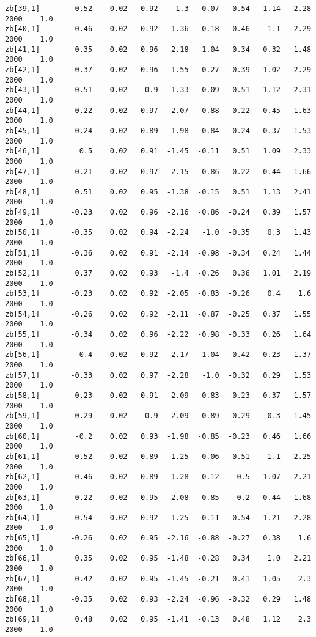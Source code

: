 \documentclass[11pt]{article}
\begin{document}
\begin{Verbatim}[commandchars=\\\{\}]
zb[39,1]        0.52    0.02   0.92   -1.3  -0.07   0.54   1.14   2.28   2000    1.0
zb[40,1]        0.46    0.02   0.92  -1.36  -0.18   0.46    1.1   2.29   2000    1.0
zb[41,1]       -0.35    0.02   0.96  -2.18  -1.04  -0.34   0.32   1.48   2000    1.0
zb[42,1]        0.37    0.02   0.96  -1.55  -0.27   0.39   1.02   2.29   2000    1.0
zb[43,1]        0.51    0.02    0.9  -1.33  -0.09   0.51   1.12   2.31   2000    1.0
zb[44,1]       -0.22    0.02   0.97  -2.07  -0.88  -0.22   0.45   1.63   2000    1.0
zb[45,1]       -0.24    0.02   0.89  -1.98  -0.84  -0.24   0.37   1.53   2000    1.0
zb[46,1]         0.5    0.02   0.91  -1.45  -0.11   0.51   1.09   2.33   2000    1.0
zb[47,1]       -0.21    0.02   0.97  -2.15  -0.86  -0.22   0.44   1.66   2000    1.0
zb[48,1]        0.51    0.02   0.95  -1.38  -0.15   0.51   1.13   2.41   2000    1.0
zb[49,1]       -0.23    0.02   0.96  -2.16  -0.86  -0.24   0.39   1.57   2000    1.0
zb[50,1]       -0.35    0.02   0.94  -2.24   -1.0  -0.35    0.3   1.43   2000    1.0
zb[51,1]       -0.36    0.02   0.91  -2.14  -0.98  -0.34   0.24   1.44   2000    1.0
zb[52,1]        0.37    0.02   0.93   -1.4  -0.26   0.36   1.01   2.19   2000    1.0
zb[53,1]       -0.23    0.02   0.92  -2.05  -0.83  -0.26    0.4    1.6   2000    1.0
zb[54,1]       -0.26    0.02   0.92  -2.11  -0.87  -0.25   0.37   1.55   2000    1.0
zb[55,1]       -0.34    0.02   0.96  -2.22  -0.98  -0.33   0.26   1.64   2000    1.0
zb[56,1]        -0.4    0.02   0.92  -2.17  -1.04  -0.42   0.23   1.37   2000    1.0
zb[57,1]       -0.33    0.02   0.97  -2.28   -1.0  -0.32   0.29   1.53   2000    1.0
zb[58,1]       -0.23    0.02   0.91  -2.09  -0.83  -0.23   0.37   1.57   2000    1.0
zb[59,1]       -0.29    0.02    0.9  -2.09  -0.89  -0.29    0.3   1.45   2000    1.0
zb[60,1]        -0.2    0.02   0.93  -1.98  -0.85  -0.23   0.46   1.66   2000    1.0
zb[61,1]        0.52    0.02   0.89  -1.25  -0.06   0.51    1.1   2.25   2000    1.0
zb[62,1]        0.46    0.02   0.89  -1.28  -0.12    0.5   1.07   2.21   2000    1.0
zb[63,1]       -0.22    0.02   0.95  -2.08  -0.85   -0.2   0.44   1.68   2000    1.0
zb[64,1]        0.54    0.02   0.92  -1.25  -0.11   0.54   1.21   2.28   2000    1.0
zb[65,1]       -0.26    0.02   0.95  -2.16  -0.88  -0.27   0.38    1.6   2000    1.0
zb[66,1]        0.35    0.02   0.95  -1.48  -0.28   0.34    1.0   2.21   2000    1.0
zb[67,1]        0.42    0.02   0.95  -1.45  -0.21   0.41   1.05    2.3   2000    1.0
zb[68,1]       -0.35    0.02   0.93  -2.24  -0.96  -0.32   0.29   1.48   2000    1.0
zb[69,1]        0.48    0.02   0.95  -1.41  -0.13   0.48   1.12    2.3   2000    1.0

\end{Verbatim}
\end{document}

